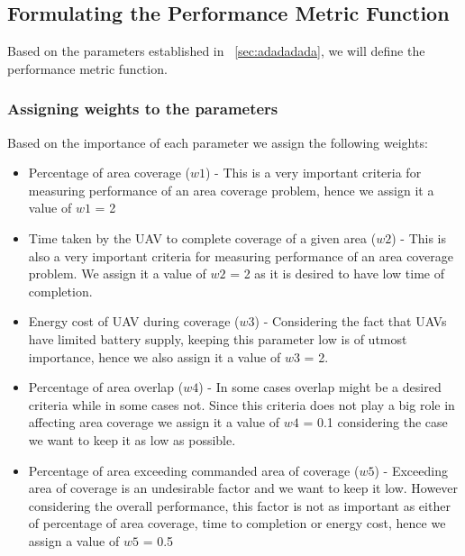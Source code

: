 \subsection{Formulating the Performance Metric Function}
Based on the parameters established in ~\ref{sec:adadadada}, we will define the performance metric function.

\subsubsection{Assigning weights to the parameters}
\label{subsubsec:jjjjhhh1}
Based on the importance of each parameter we assign the following weights:
\begin{itemize}
\item Percentage of area coverage ($w1$) - This is a very important criteria for measuring performance of an area coverage problem, hence we assign it a value of $w1$ = 2
\item Time taken by the UAV to complete coverage of a given area ($w2$) - This is also a very important criteria for measuring performance of an area coverage problem. We assign it a value of $w2$ = 2 as it is desired to have low time of completion.
\item Energy cost of UAV during coverage ($w3$) - Considering the fact that UAVs have limited battery supply, keeping this parameter low is of utmost importance, hence we also assign it a value of $w3$ = 2.
\item Percentage of area overlap ($w4$) - In some cases overlap might be a desired criteria while in some cases not. Since this criteria does not play a big role in affecting area coverage we assign it a value of $w4$ = 0.1 considering the case we want to keep it as low as possible.
\item Percentage of area exceeding commanded area of coverage ($w5$) - Exceeding area of coverage is an undesirable factor and we want to keep it low. However considering the overall performance, this factor is not as important as either of percentage of area coverage, time to completion or energy cost, hence we assign a value of $w5$ = 0.5
\end{itemize}
